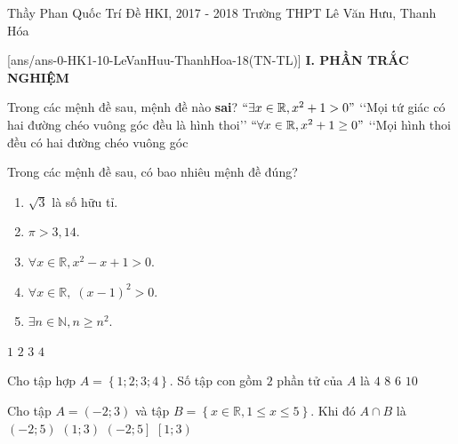 	\begin{name}
		{Thầy Phan Quốc Trí}
		{Đề HKI, 2017 - 2018 Trường THPT Lê Văn Hưu, Thanh Hóa}
	\end{name}
	\setcounter{ex}{0}\setcounter{bt}{0}
	[ans/ans-0-HK1-10-LeVanHuu-ThanhHoa-18(TN-TL)]
\noindent\textbf{I. PHẦN TRẮC NGHIỆM}
\begin{ex}%
Trong các mệnh đề sau, mệnh đề nào \textbf{sai}?
\choice
{$`` \exists x \in \mathbb{R}, x^2+1>0"$}
{\True \lq \lq Mọi tứ giác có hai đường chéo vuông góc đều là hình thoi\rq \rq}
{$``\forall x \in \mathbb{R}, x^2+1 \ge 0 "$}
{\lq \lq Mọi hình thoi đều có hai đường chéo vuông góc}
\loigiai{

}
\end{ex}
\begin{ex}%
Trong các mệnh đề sau, có bao nhiêu mệnh đề đúng?
\begin{multicols}{2}
\begin{enumerate}[(1)]
\item $\sqrt{3}$ là số hữu tỉ.
\item $\pi > 3,14$.
\item $\forall x \in \mathbb{R}, x^2-x+1>0$.
\item $\forall x \in \mathbb{R}, \; (x-1)^2>0$.
\item $\exists n \in \mathbb{N}, n \ge n^2$.
\end{enumerate}
\end{multicols}
\choice
{$ 1$}
{$2 $}
{\True $3 $}
{$4 $}
\end{ex}
\begin{ex}%
Cho tập hợp $A= \left\lbrace 1;2;3;4  \right\rbrace$. Số tập con gồm $2$ phần tử của $A$ là
\choice
{$4 $}
{$8 $}
{\True $6 $}
{$10 $}
\end{ex}
\begin{ex}%
Cho tập $A=\left(-2;3\right)$ và tập $B=\left\lbrace x \in \mathbb{R}, 1 \le x \le 5 \right\rbrace$. Khi đó $A\cap B$ là
\choice
{$(-2;5)$}
{$(1;3)$}
{$\left( - 2;5 \right]$}
{\True $ \left[ 1;3 \right) $}
\loigiai{
$B=\left\lbrace x \in \mathbb{R}, 1 \le x \le 5 \right\rbrace \Rightarrow B=\left[1;5 \right] \Rightarrow A \cap B = \left[ 1;3 \right)$.
}
\end{ex}
